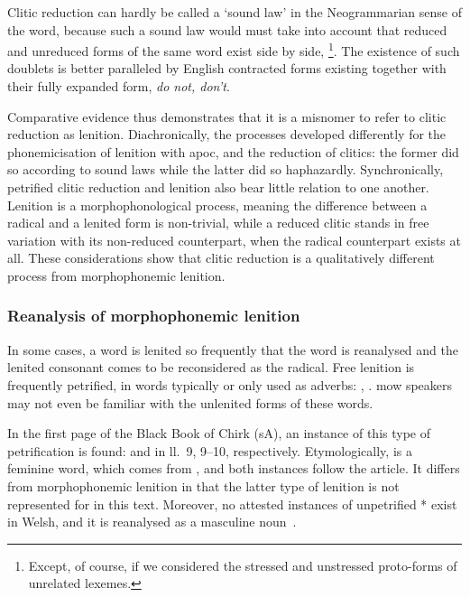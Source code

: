 Clitic reduction can hardly be called a `sound law' in the Neogrammarian sense of the word, because such a sound law would must take into account that reduced and unreduced forms of the same word  exist side by side, \eg {}\footnote{%
  Except, of course, if we considered the stressed and unstressed proto-forms of  unrelated lexemes.
}.
The existence of such doublets is better paralleled by English contracted forms existing together with their fully expanded form, \eg \emph{do not, don't}.


Comparative evidence thus demonstrates that it is a misnomer to refer to clitic reduction as lenition.
Diachronically, the processes developed differently for the phonemicisation of lenition with \gls{apoc}, and the reduction of clitics: the former did so according to sound laws while the latter did so haphazardly.
Synchronically, petrified clitic reduction and lenition also bear little relation to one another. Lenition is a morphophonological process, meaning the difference between a radical and a lenited form is non-trivial, while a reduced clitic stands in free variation with its non-reduced counterpart, when the radical counterpart exists at all. 
These considerations show that clitic reduction is a qualitatively different process from morphophonemic lenition. 

\subsubsection{Reanalysis of morphophonemic lenition}
\label{sec:rean-morph-lenit}
In some cases,  a word is lenited so frequently that the word is reanalysed and the lenited consonant comes to be reconsidered as the radical.
Free lenition is frequently petrified, \eg in words typically or only used as adverbs: , . \Gls{mow} speakers may not even be familiar with the unlenited forms of these words.



In the first page of the Black Book of Chirk (\gls{sA}), an instance of this type of petrification is found:  and  in ll.~9, 9--10, respectively. 
Etymologically,  is a feminine word, which comes from , and both instances follow the article. 
It differs from morphophonemic lenition in that the latter type of lenition is not represented for  in this text. 
Moreover, no attested instances of unpetrified  * exist in Welsh, and it is reanalysed as a masculine noun~\autocite[s.v.~]{bevan_geiriadur_2014}. 

